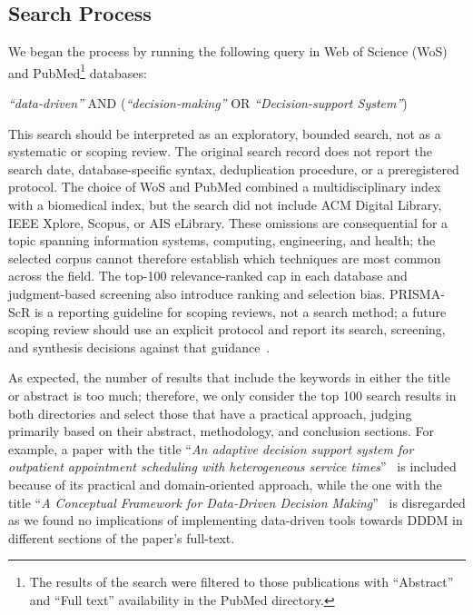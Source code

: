 \documentclass{sfuthesis}
\begin{document}
\subsection{Search Process}
We began the process by running the following query in Web of Science (WoS) and PubMed\footnote{The results of the search were filtered to those publications with “Abstract” and “Full text” availability in the PubMed directory.} databases:\par
\begin{center}
\textit{“data-driven”} AND (\textit{“decision-making”} OR \textit{“Decision-support System”})
\end{center}
This search should be interpreted as an exploratory, bounded search, not as a systematic or scoping review. The original search record does not report the search date, database-specific syntax, deduplication procedure, or a preregistered protocol. The choice of WoS and PubMed combined a multidisciplinary index with a biomedical index, but the search did not include ACM Digital Library, IEEE Xplore, Scopus, or AIS eLibrary. These omissions are consequential for a topic spanning information systems, computing, engineering, and health; the selected corpus cannot therefore establish which techniques are most common across the field. The top-100 relevance-ranked cap in each database and judgment-based screening also introduce ranking and selection bias. PRISMA-ScR is a reporting guideline for scoping reviews, not a search method; a future scoping review should use an explicit protocol and report its search, screening, and synthesis decisions against that guidance~\cite{tricco2018prisma}.\par
As expected, the number of results that include the keywords in either the title or abstract is too much; therefore, we only consider the top 100 search results in both directories and select those that have a practical approach, judging primarily based on their abstract, methodology, and conclusion sections. For example, a paper with the title “\textit{An adaptive decision support system for outpatient appointment scheduling with heterogeneous service times}”~\cite{feng2024adaptive} is included because of its practical and domain-oriented approach, while the one with the title “\textit{A Conceptual Framework for Data-Driven Decision Making}”~\cite{gill_conceptual_2014} is disregarded as we found no implications of implementing data-driven tools towards DDDM in different sections of the paper’s full-text.
\end{document}
